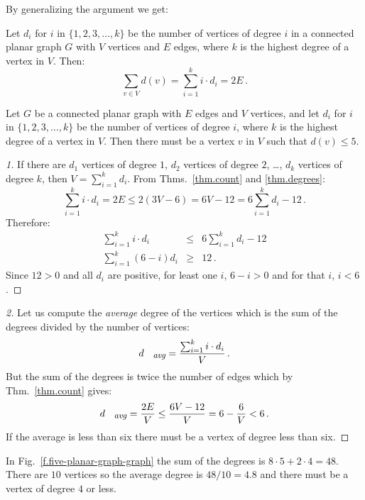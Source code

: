 \newpage

By generalizing the argument we get:
\begin{theorem}\label{thm.degrees}
Let $d_i$ for $i$ in $\{1,2,3,\ldots,k\}$ be the number of vertices of degree $i$ in a connected planar graph $G$ with $V$ vertices and $E$ edges, where $k$ is the highest degree of a vertex in $V$. Then:
\[
\sum_{v\in V} d(v) =\sum_{i=1}^{k} i\cdot d_i=2E\,.
\]
\end{theorem}

\begin{theorem}\label{thm.degree5}
Let $G$ be a connected planar graph with $E$ edges and $V$ vertices, and let $d_i$ for $i$ in $\{1,2,3,\ldots,k\}$ be the number of vertices of degree $i$, where $k$ is the highest degree of a vertex in $V$. Then there must be a vertex $v$ in $V$ such that $d(v) \leq 5$.
\end{theorem}

\begin{proof}[1]
If there are $d_1$ vertices of degree $1$, $d_2$ vertices of degree $2$, \ldots, $d_k$ vertices of degree $k$, then $V=\sum_{i=1}^{k}d_i$.  From Thms.~\ref{thm.count} and \ref{thm.degrees}:
\[
\sum_{i=1}^{k} i\cdot d_i=2E\leq 2(3V-6) = 6V-12=6\sum_{i=1}^{k} d_i -12\,.
\]
Therefore:
%
\begin{eqnarray*}
\sum_{i=1}^{k} i\cdot d_i &\leq& 6\sum_{i=1}^{k} d_i -12\\
\sum_{i=1}^{k} (6-i)d_i&\geq& 12\,.
\end{eqnarray*}
Since $12>0$ and all $d_i$ are positive, for least one $i$, $6-i>0$ and for that $i$, $i<6$.
\end{proof}

\begin{proof}[2]
Let us compute the \emph{average} degree of the vertices which is the sum of the degrees divided by the number of vertices:
\[
d_{\textit{\footnotesize avg}}=\frac{\sum_{i=1}^{k} i\cdot d_i}{V}\,.
\]
But the sum of the degrees is twice the number of edges which by Thm.~\ref{thm.count} gives:
\[
d_{\textit{\footnotesize avg}}=\frac{2E}{V}\leq \frac{6V-12}{V}=6-\frac{6}{V}<6\,.
\]
If the average is less than six there must be a vertex of degree less than six.
\end{proof}

\begin{example}
In Fig.~\ref{f.five-planar-graph-graph} the sum of the degrees is $8\cdot 5 + 2\cdot 4=48$. There are $10$ vertices so the average degree is $48/10=4.8$ and there must be a vertex of degree $4$ or less.
\end{example}

